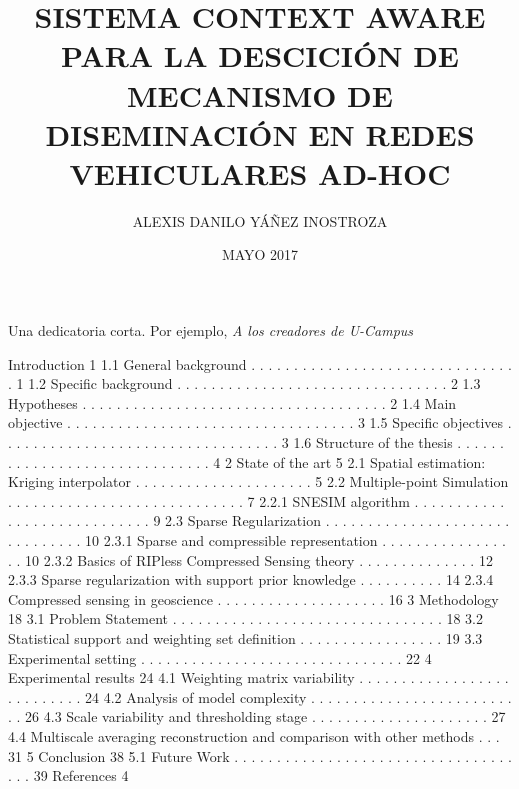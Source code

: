 \documentclass[upright, contnum]{umemoria}
\author{ALEXIS DANILO YÁÑEZ INOSTROZA}
\title{SISTEMA CONTEXT AWARE PARA LA DESCICIÓN DE MECANISMO DE DISEMINACIÓN EN REDES VEHICULARES AD-HOC}
\date{MAYO 2017}
\begin{document}
\frontmatter
\maketitle

\begin{abstract}
{\lipsum[1-4]}
\end{abstract}

\begin{dedicatoria} %
Una dedicatoria corta. Por ejemplo, \emph{A los creadores de U-Campus}
\end{dedicatoria}

\begin{thanks} %
\lipsum[1-2]
\end{thanks}
\cleardoublepage

\tableofcontents
\listoftables %
\listoffigures %

 Introduction 1
1.1 General background . . . . . . . . . . . . . . . . . . . . . . . . . . . . . . . . 1
1.2 Specific background . . . . . . . . . . . . . . . . . . . . . . . . . . . . . . . . 2
1.3 Hypotheses . . . . . . . . . . . . . . . . . . . . . . . . . . . . . . . . . . . . 2
1.4 Main objective . . . . . . . . . . . . . . . . . . . . . . . . . . . . . . . . . . 3
1.5 Specific objectives . . . . . . . . . . . . . . . . . . . . . . . . . . . . . . . . . 3
1.6 Structure of the thesis . . . . . . . . . . . . . . . . . . . . . . . . . . . . . . 4
2 State of the art 5
2.1 Spatial estimation: Kriging interpolator . . . . . . . . . . . . . . . . . . . . . 5
2.2 Multiple-point Simulation . . . . . . . . . . . . . . . . . . . . . . . . . . . . 7
2.2.1 SNESIM algorithm . . . . . . . . . . . . . . . . . . . . . . . . . . . . 9
2.3 Sparse Regularization . . . . . . . . . . . . . . . . . . . . . . . . . . . . . . . 10
2.3.1 Sparse and compressible representation . . . . . . . . . . . . . . . . . 10
2.3.2 Basics of RIPless Compressed Sensing theory . . . . . . . . . . . . . . 12
2.3.3 Sparse regularization with support prior knowledge . . . . . . . . . . 14
2.3.4 Compressed sensing in geoscience . . . . . . . . . . . . . . . . . . . . 16
3 Methodology 18
3.1 Problem Statement . . . . . . . . . . . . . . . . . . . . . . . . . . . . . . . . 18
3.2 Statistical support and weighting set definition . . . . . . . . . . . . . . . . . 19
3.3 Experimental setting . . . . . . . . . . . . . . . . . . . . . . . . . . . . . . . 22
4 Experimental results 24
4.1 Weighting matrix variability . . . . . . . . . . . . . . . . . . . . . . . . . . . 24
4.2 Analysis of model complexity . . . . . . . . . . . . . . . . . . . . . . . . . . 26
4.3 Scale variability and thresholding stage . . . . . . . . . . . . . . . . . . . . . 27
4.4 Multiscale averaging reconstruction and comparison with other methods . . . 31
5 Conclusion 38
5.1 Future Work . . . . . . . . . . . . . . . . . . . . . . . . . . . . . . . . . . . . 39
References 4






\nocite{*}



\end{document}
